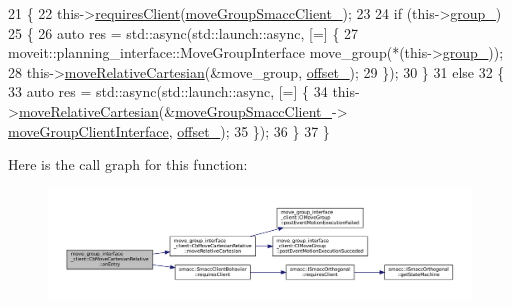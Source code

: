 \begin{DoxyCode}
21 \{
22   this->\hyperlink{classsmacc_1_1SmaccClientBehavior_a917f001e763a1059af337bf4e164f542}{requiresClient}(\hyperlink{classmove__group__interface__client_1_1CbMoveCartesianRelative_aaa8b86680f04a6cfd7ac6b42268bf04d}{moveGroupSmaccClient\_});
23 
24   \textcolor{keywordflow}{if} (this->\hyperlink{classmove__group__interface__client_1_1CbMoveCartesianRelative_a5da33d1b7d822c971f8e282e5ade7238}{group\_})
25   \{
26     \textcolor{keyword}{auto} res = std::async(std::launch::async, [=] \{
27       moveit::planning\_interface::MoveGroupInterface move\_group(*(this->\hyperlink{classmove__group__interface__client_1_1CbMoveCartesianRelative_a5da33d1b7d822c971f8e282e5ade7238}{group\_}));
28       this->\hyperlink{classmove__group__interface__client_1_1CbMoveCartesianRelative_a85b6b1c8738c372174dff8fd98ec1b7a}{moveRelativeCartesian}(&move\_group, \hyperlink{classmove__group__interface__client_1_1CbMoveCartesianRelative_affe67c635e1cd77013609a784ac53b92}{offset\_});
29     \});
30   \}
31   \textcolor{keywordflow}{else}
32   \{
33     \textcolor{keyword}{auto} res = std::async(std::launch::async, [=] \{
34       this->\hyperlink{classmove__group__interface__client_1_1CbMoveCartesianRelative_a85b6b1c8738c372174dff8fd98ec1b7a}{moveRelativeCartesian}(&\hyperlink{classmove__group__interface__client_1_1CbMoveCartesianRelative_aaa8b86680f04a6cfd7ac6b42268bf04d}{moveGroupSmaccClient\_}->
      \hyperlink{classmove__group__interface__client_1_1ClMoveGroup_a5f0ea9b52695661b17605691168d1f31}{moveGroupClientInterface}, \hyperlink{classmove__group__interface__client_1_1CbMoveCartesianRelative_affe67c635e1cd77013609a784ac53b92}{offset\_});
35     \});
36   \}
37 \}
\end{DoxyCode}
Here is the call graph for this function\+:
\nopagebreak
\begin{figure}[H]
\begin{center}
\leavevmode
\includegraphics[width=350pt]{classmove__group__interface__client_1_1CbMoveCartesianRelative_a549d1612f552cab64208c37b7e383e1c_cgraph}
\end{center}
\end{figure}
\mbox{\label{classmove__group__interface__client_1_1CbMoveCartesianRelative_a100d2d75fa5d74cc5b15087100658fb8}} 
